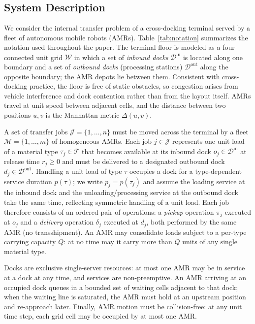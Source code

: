 \subsection{System Description}

We consider the internal transfer problem of a cross-docking terminal
served by a fleet of autonomous mobile robots (AMRs). Table~\ref{tab:notation}
summarizes the notation used throughout the paper. The terminal floor
is modeled as a four-connected unit grid $\mathcal{W}$ in which a set of
\emph{inbound docks} $\mathcal{D}^{\mathrm{in}}$ is located along one
boundary and a set of \emph{outbound docks} (processing stations)
$\mathcal{D}^{\mathrm{out}}$ along the opposite boundary; the AMR depots
lie between them. Consistent with cross-docking practice, the floor is
free of static obstacles, so congestion arises from vehicle interference
and dock contention rather than from the layout itself. AMRs travel at
unit speed between adjacent cells, and the distance between two
positions $u,v$ is the Manhattan metric $\Delta(u,v)$.

A set of transfer jobs $\mathcal{J}=\{1,\dots,n\}$ must be moved across
the terminal by a fleet $\mathcal{M}=\{1,\dots,m\}$ of homogeneous AMRs.
Each job $j\in\mathcal{J}$ represents one unit load of a material type
$\tau_j\in\mathcal{T}$ that becomes available at its inbound dock
$o_j\in\mathcal{D}^{\mathrm{in}}$ at release time $r_j\ge 0$ and must be
delivered to a designated outbound dock
$d_j\in\mathcal{D}^{\mathrm{out}}$. Handling a unit load of type $\tau$
occupies a dock for a type-dependent service duration $p(\tau)$; we
write $p_j=p(\tau_j)$ and assume the loading service at the inbound dock
and the unloading/processing service at the outbound dock take the same
time, reflecting symmetric handling of a unit load. Each job therefore
consists of an ordered pair of operations: a \emph{pickup} operation
$\pi_j$ executed at $o_j$ and a \emph{delivery} operation $\delta_j$
executed at $d_j$, both performed by the same AMR (no transshipment).
An AMR may consolidate loads subject to a per-type carrying capacity
$Q$: at no time may it carry more than $Q$ units of any single material
type.

Docks are exclusive single-server resources: at most one AMR may be in
service at a dock at any time, and services are non-preemptive. An AMR
arriving at an occupied dock queues in a bounded set of waiting cells
adjacent to that dock; when the waiting line is saturated, the AMR must
hold at an upstream position and re-approach later. Finally, AMR motion
must be collision-free: at any unit time step, each grid cell may be
occupied by at most one AMR.


